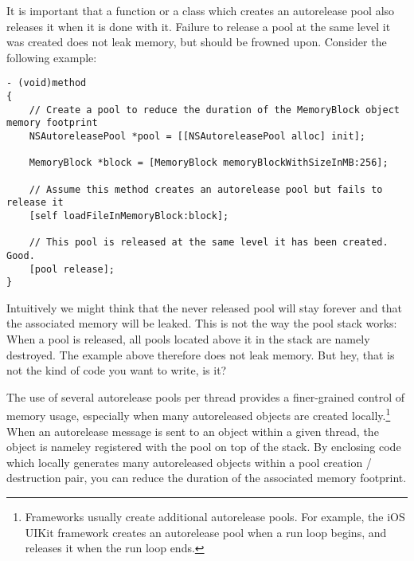 It is important that a function or a class which creates an autorelease pool also releases it when it is done with it. Failure to release a pool at the same level it was created does not leak memory, but should be frowned upon. Consider the following example:
\begin{lstlisting}[frame=single]
- (void)method
{
    // Create a pool to reduce the duration of the MemoryBlock object memory footprint
    NSAutoreleasePool *pool = [[NSAutoreleasePool alloc] init];
    
    MemoryBlock *block = [MemoryBlock memoryBlockWithSizeInMB:256];
    
    // Assume this method creates an autorelease pool but fails to release it
    [self loadFileInMemoryBlock:block];
    
    // This pool is released at the same level it has been created. Good.
    [pool release];
}
\end{lstlisting}
Intuitively we might think that the never released pool will stay forever and that the associated memory will be leaked. This is not the way the pool stack works: When a pool is released, all pools located above it in the stack are namely destroyed. The example above therefore does not leak memory. But hey, that is not the kind of code you want to write, is it?

The use of several autorelease pools per thread provides a finer-grained control of memory usage, especially when many autoreleased objects are created locally.\footnote{Frameworks usually create additional autorelease pools. For example, the iOS UIKit framework creates an autorelease pool when a run loop begins, and releases it when the run loop ends.} When an autorelease message is sent to an object within a given thread, the object is nameley registered with the pool on top of the stack. By enclosing code which locally generates many autoreleased objects within a pool creation / destruction pair, you can reduce the duration of the associated memory footprint.

